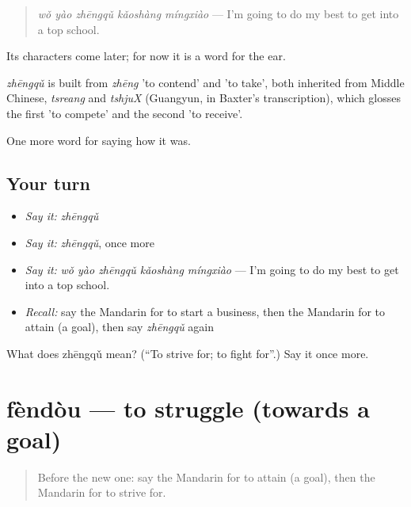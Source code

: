 \begin{quote}
\emph{wǒ yào zhēngqǔ kǎoshàng míngxiào} — I'm going to do my best to get into a top school.
\end{quote}

Its characters come later; for now it is a word for the ear.

\begin{cousinweb}
\emph{zhēngqǔ} is built from \emph{zhēng} 'to contend' and  'to take', both inherited from Middle Chinese, \emph{tsreang} and \emph{tshjuX} (Guangyun, in Baxter's transcription), which glosses the first 'to compete' and the second 'to receive'.
\end{cousinweb}

\begin{grammarlens}[title={What you've built}]
One more word for saying how it was.
\end{grammarlens}

\subsection*{Your turn}
\begin{itemize}
\raggedright
  \item \emph{Say it:} \emph{zhēngqǔ}
  \item \emph{Say it:} \emph{zhēngqǔ}, once more
  \item \emph{Say it:} \emph{wǒ yào zhēngqǔ kǎoshàng míngxiào} — I'm going to do my best to get into a top school.
  \item \emph{Recall:} say the Mandarin for to start a business, then the Mandarin for to attain (a goal), then say \emph{zhēngqǔ} again
\end{itemize}

\begin{tcolorbox}[breakable,colback=teal!4,colframe=teal!35!black,title={Before you move on}]
What does zhēngqǔ mean? (\textquotedblleft{}To strive for; to fight for\textquotedblright{}.) Say it once more.
\end{tcolorbox}
\section[fèndòu]{fèndòu — to struggle (towards a goal)}

\label{lesson:ZH-C513-fendou}



\begin{quote}
Before the new one: say the Mandarin for to attain (a goal), then the Mandarin for to strive for.
\end{quote}

